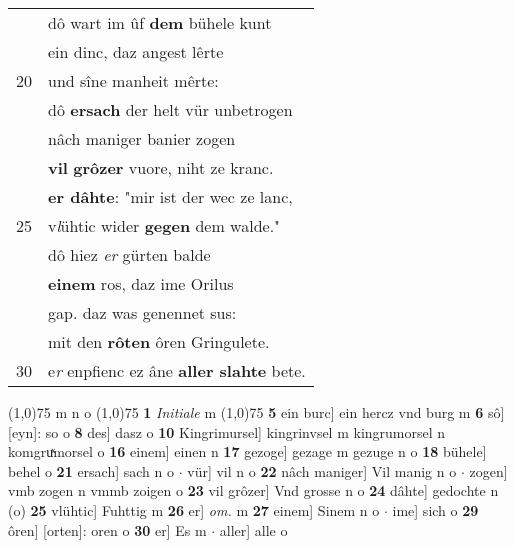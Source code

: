 \documentclass[8pt,a4paper,notitlepage]{article}
\begin{document}
\begin{table}[ht]
\begin{minipage}[t]{0.5\linewidth}
\begin{tabular}{rl}
 & dô wart im ûf \textbf{dem} bühele kunt\\ 
 & ein dinc, daz angest lêrte\\ 
20 & und sîne manheit mêrte:\\ 
 & dô \textbf{ersach} der helt vür unbetrogen\\ 
 & nâch maniger banier zogen\\ 
 & \textbf{vil} \textbf{grôzer} vuore, niht ze kranc.\\ 
 & \textbf{er dâhte}: "mir ist der wec ze lanc,\\ 
25 & v\textit{l}ühtic wider \textbf{gegen} dem walde."\\ 
 & dô hiez \textit{er} gürten balde\\ 
 & \textbf{einem} ros, daz ime Orilus\\ 
 & gap. daz was genennet sus:\\ 
 & mit den \textbf{rôten} ôren Gringulete.\\ 
30 & e\textit{r} enpfienc ez âne \textbf{aller slahte} bete.\\ 
\end{tabular}
\scriptsize
\line(1,0){75} \newline
m n o \newline
\line(1,0){75} \newline
\textbf{1} \textit{Initiale} m  \newline
\line(1,0){75} \newline
\textbf{5} ein burc] ein hercz vnd burg m \textbf{6} sô] [eyn]: so o \textbf{8} des] dasz o \textbf{10} Kingrimursel] kingrinvsel m kingrumorsel n komgruͯmorsel o \textbf{16} einem] einen n \textbf{17} gezoge] gezage m gezuge n o \textbf{18} bühele] behel o \textbf{21} ersach] sach n o  $\cdot$ vür] vil n o \textbf{22} nâch maniger] Vil manig n o  $\cdot$ zogen] vmb zogen n vmmb zoigen o \textbf{23} vil grôzer] Vnd grosse n o \textbf{24} dâhte] gedochte n (o) \textbf{25} vlühtic] Fuhttig m \textbf{26} er] \textit{om.} m \textbf{27} einem] Sinem n o  $\cdot$ ime] sich o \textbf{29} ôren] [orten]: oren o \textbf{30} er] Es m  $\cdot$ aller] alle o \newline
\end{minipage}
\end{table}
\newpage
\end{document}
